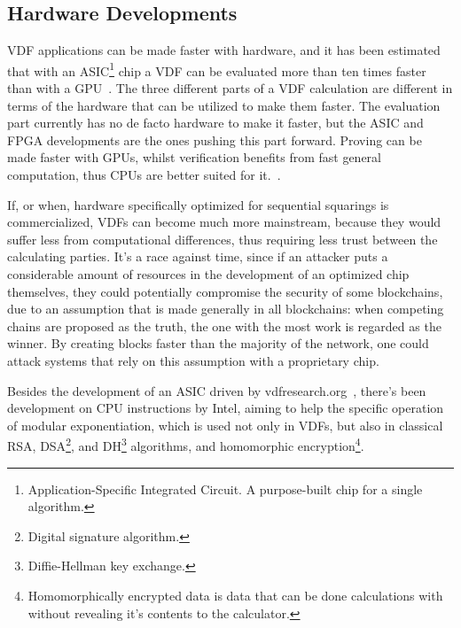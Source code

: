 \subsection{Hardware Developments}
VDF applications can be made faster with hardware, and it has been estimated that with an ASIC\footnote{Application-Specific Integrated Circuit. A purpose-built chip for a single algorithm.} chip a VDF can be evaluated more than ten times faster than with a GPU~\cite{Stanford_Video2020-ap}.
The three different parts of a VDF calculation are different in terms of the hardware that can be utilized to make them faster. The evaluation part currently has no de facto hardware to make it faster, but the ASIC and FPGA developments are the ones pushing this part forward. Proving can be made faster with GPUs, whilst verification benefits from fast general computation, thus CPUs are better suited for it.~\cite{Olson2020-au}.

If, or when, hardware specifically optimized for sequential squarings is commercialized, VDFs can become much more mainstream, because they would suffer less from computational differences, thus requiring less trust between the calculating parties. It's a race against time, since if an attacker puts a considerable amount of resources in the development of an optimized chip themselves, they could potentially compromise the security of some blockchains, due to an assumption that is made generally in all blockchains: when competing chains are proposed as the truth, the one with the most work is regarded as the winner. By creating blocks faster than the majority of the network, one could attack systems that rely on this assumption with a proprietary chip.

Besides the development of an ASIC driven by vdfresearch.org~\cite{noauthor_undated-hk}, there's been development on CPU instructions by Intel, aiming to help the specific operation of modular exponentiation, which is used not only in VDFs, but also in classical RSA, DSA\footnote{Digital signature algorithm.}, and DH\footnote{Diffie-Hellman key exchange.} algorithms, and homomorphic encryption\footnote{Homomorphically encrypted data is data that can be done calculations with without revealing it's contents to the calculator.}.~\cite{Drucker2019-cx}
